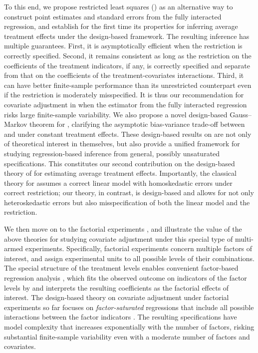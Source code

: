 \documentclass[11pt]{article}
\theoremstyle{definition}
\begin{document}
To this end,  we propose restricted least squares (\rols) as an alternative way to construct point estimates and standard errors from the fully interacted regression, and establish for the first time its properties for inferring average treatment effects under the design-based framework.
The resulting inference has multiple guarantees. First, it is asymptotically efficient when the restriction is correctly specified. Second, it remains consistent as long as the restriction on the coefficients of the treatment indicators, if any, is correctly specified and separate from that on the coefficients of the treatment-covariates interactions. Third, it can have better finite-sample performance than its unrestricted counterpart even if the restriction is moderately misspecified. 
It is thus our recommendation for covariate adjustment in \mess when the \olss estimator from the fully interacted regression risks large finite-sample variability. We also propose a novel design-based Gauss--Markov theorem for \rls, clarifying the asymptotic bias-variance trade-off between \olss and \rlss under constant treatment effects. 
These design-based results on \rlss are not only of theoretical interest in themselves, but also provide a unified framework for studying regression-based inference from general, possibly unsaturated specifications. 
This constitutes our second contribution on the design-based theory of \rlss for estimating average treatment effects.  Importantly, the classical theory for \rlss assumes a correct linear model with homoskedastic errors under correct restriction; our theory, in contrast, is design-based and allows for not only heteroskedastic errors but also misspecification of both the linear model and the restriction.

 
 
We then move on to the factorial experiments \citep{box, wh, DasFact15, ZDa}, and illustrate the value of the above theories for studying covariate adjustment under this special type of multi-armed experiments. 
Specifically, factorial experiments concern multiple factors of interest, and assign experimental units to all possible levels of their combinations. The special structure of the treatment levels enables convenient factor-based regression analysis \citep{wh, lu16bFact, lu2016covariate, ZDa}, which fits the observed outcome on indicators of the factor levels by \olss and interprets the resulting coefficients as the factorial effects of interest.  The design-based theory on covariate adjustment under factorial experiments so far focuses on {\it factor-saturated} regressions that include all possible interactions between the factor indicators \citep{lu2016covariate, ZDb}. The resulting specifications have model complexity that increases exponentially with the number of factors, risking substantial finite-sample variability even with a moderate number of factors and covariates. 
\end{document}
